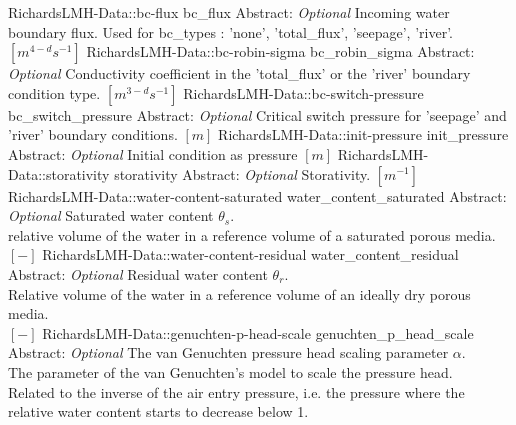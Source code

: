 \begin{RecordType}
		\RecKey
			{RichardsLMH-Data::bc-flux}
			{bc{\_}flux}
			{{Abstract}{: }}
			{ \it{Optional} }
			{{{Incoming water boundary flux. Used for bc{\_}types : 'none', 'total{\_}flux', 'seepage', 'river'. }{$[m^{4-d}s^{-1}]$}}}
		\RecKey
			{RichardsLMH-Data::bc-robin-sigma}
			{bc{\_}robin{\_}sigma}
			{{Abstract}{: }}
			{ \it{Optional} }
			{{{Conductivity coefficient in the 'total{\_}flux' or the 'river' boundary condition type. }{$[m^{3-d}s^{-1}]$}}}
		\RecKey
			{RichardsLMH-Data::bc-switch-pressure}
			{bc{\_}switch{\_}pressure}
			{{Abstract}{: }}
			{ \it{Optional} }
			{{{Critical switch pressure for 'seepage' and 'river' boundary conditions. }{$[m]$}}}
		\RecKey
			{RichardsLMH-Data::init-pressure}
			{init{\_}pressure}
			{{Abstract}{: }}
			{ \it{Optional} }
			{{{Initial condition as pressure }{$[m]$}}}
		\RecKey
			{RichardsLMH-Data::storativity}
			{storativity}
			{{Abstract}{: }}
			{ \it{Optional} }
			{{{Storativity. }{$[m^{-1}]$}}}
		\RecKey
			{RichardsLMH-Data::water-content-saturated}
			{water{\_}content{\_}saturated}
			{{Abstract}{: }}
			{ \it{Optional} }
			{{{Saturated water content }{$ \theta_s $}{.}\\{
relative volume of the water in a reference volume of a saturated porous media.}\\{
 }{$[-]$}}}
		\RecKey
			{RichardsLMH-Data::water-content-residual}
			{water{\_}content{\_}residual}
			{{Abstract}{: }}
			{ \it{Optional} }
			{{{Residual water content }{$ \theta_r $}{.}\\{
Relative volume of the water in a reference volume of an ideally dry porous media.}\\{
 }{$[-]$}}}
		\RecKey
			{RichardsLMH-Data::genuchten-p-head-scale}
			{genuchten{\_}p{\_}head{\_}scale}
			{{Abstract}{: }}
			{ \it{Optional} }
			{{{The van Genuchten pressure head scaling parameter }{$ \alpha $}{.}\\{
The parameter of the van Genuchten's model to scale the pressure head.}\\{
Related to the inverse of the air entry pressure, i.e. the pressure where the relative water content starts to decrease below 1.}\\{
}}}
\end{RecordType}
